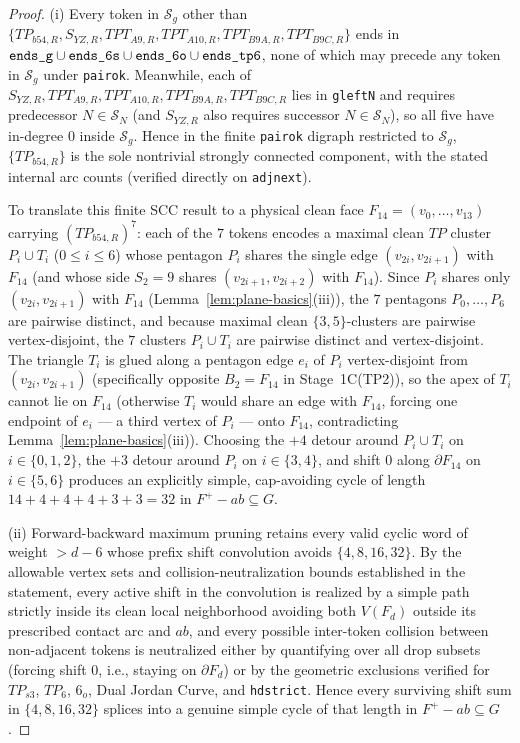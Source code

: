 \documentclass[11pt,reqno]{amsart}
\theoremstyle{plain}
\theoremstyle{definition}
\theoremstyle{remark}
\DeclareRobustCommand{\_}{\ifmmode\text{\textunderscore}\else\textunderscore\allowbreak\fi}
\begin{document}
\begin{proof}
(i) Every token in $\mathcal{S}_g$ other than $\{TP_{b54,R}, S_{YZ,R}, TPT_{A9,R}, TPT_{A10,R}, TPT_{B9A,R}, TPT_{B9C,R}\}$ ends in $\texttt{ends\_g} \cup \texttt{ends\_6s} \cup \texttt{ends\_6o} \cup \texttt{ends\_tp6}$, none of which may precede any token in $\mathcal{S}_g$ under \texttt{pair\_ok}. Meanwhile, each of $S_{YZ,R}, TPT_{A9,R}, TPT_{A10,R}, TPT_{B9A,R}, TPT_{B9C,R}$ lies in \texttt{g\_left\_N} and requires predecessor $N \in \mathcal{S}_N$ (and $S_{YZ,R}$ also requires successor $N \in \mathcal{S}_N$), so all five have in-degree $0$ inside $\mathcal{S}_g$. Hence in the finite \texttt{pair\_ok} digraph restricted to $\mathcal{S}_g$, $\{TP_{b54,R}\}$ is the sole nontrivial strongly connected component, with the stated internal arc counts (verified directly on \texttt{adj\_next}).

To translate this finite SCC result to a physical clean face $F_{14} = (v_0, \dots, v_{13})$ carrying $(TP_{b54,R})^7$: each of the $7$ tokens encodes a maximal clean $TP$ cluster $P_i \cup T_i$ ($0 \le i \le 6$) whose pentagon $P_i$ shares the single edge $(v_{2i}, v_{2i+1})$ with $F_{14}$ (and whose side $S_2 = 9$ shares $(v_{2i+1}, v_{2i+2})$ with $F_{14}$). Since $P_i$ shares only $(v_{2i}, v_{2i+1})$ with $F_{14}$ (Lemma~\ref{lem:plane-basics}(iii)), the $7$ pentagons $P_0, \dots, P_6$ are pairwise distinct, and because maximal clean $\{3,5\}$-clusters are pairwise vertex-disjoint, the $7$ clusters $P_i \cup T_i$ are pairwise distinct and vertex-disjoint. The triangle $T_i$ is glued along a pentagon edge $e_i$ of $P_i$ vertex-disjoint from $(v_{2i}, v_{2i+1})$ (specifically opposite $B_2 = F_{14}$ in Stage~1C(TP2)), so the apex of $T_i$ cannot lie on $F_{14}$ (otherwise $T_i$ would share an edge with $F_{14}$, forcing one endpoint of $e_i$ — a third vertex of $P_i$ — onto $F_{14}$, contradicting Lemma~\ref{lem:plane-basics}(iii)). Choosing the $+4$ detour around $P_i \cup T_i$ on $i \in \{0, 1, 2\}$, the $+3$ detour around $P_i$ on $i \in \{3, 4\}$, and shift $0$ along $\partial F_{14}$ on $i \in \{5, 6\}$ produces an explicitly simple, cap-avoiding cycle of length $14 + 4 + 4 + 4 + 3 + 3 = 32$ in $F^+ - ab \subseteq G$.

(ii) Forward-backward maximum pruning retains every valid cyclic word of weight $> d - 6$ whose prefix shift convolution avoids $\{4, 8, 16, 32\}$. By the allowable vertex sets and collision-neutralization bounds established in the statement, every active shift in the convolution is realized by a simple path strictly inside its clean local neighborhood avoiding both $V(F_d)$ outside its prescribed contact arc and $ab$, and every possible inter-token collision between non-adjacent tokens is neutralized either by quantifying over all drop subsets (forcing shift $0$, i.e., staying on $\partial F_d$) or by the geometric exclusions verified for $TP_{s3}$, $TP_6$, $6_o$, Dual Jordan Curve, and \texttt{hd\_strict}. Hence every surviving shift sum in $\{4, 8, 16, 32\}$ splices into a genuine simple cycle of that length in $F^+ - ab \subseteq G$.
\end{proof}
\end{document}
